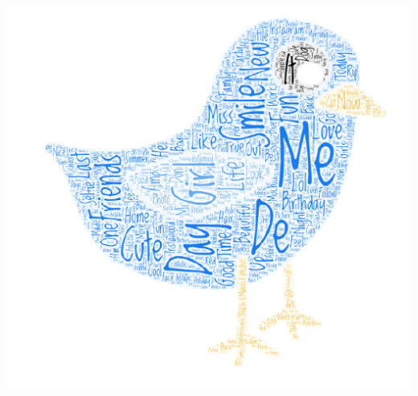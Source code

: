 \documentclass[11pt,twocolumn]{report}
\begin{document}
    \begin{center}
    \includegraphics[scale=0.3]{cloud}
    \end{center}
    
\end{document}
